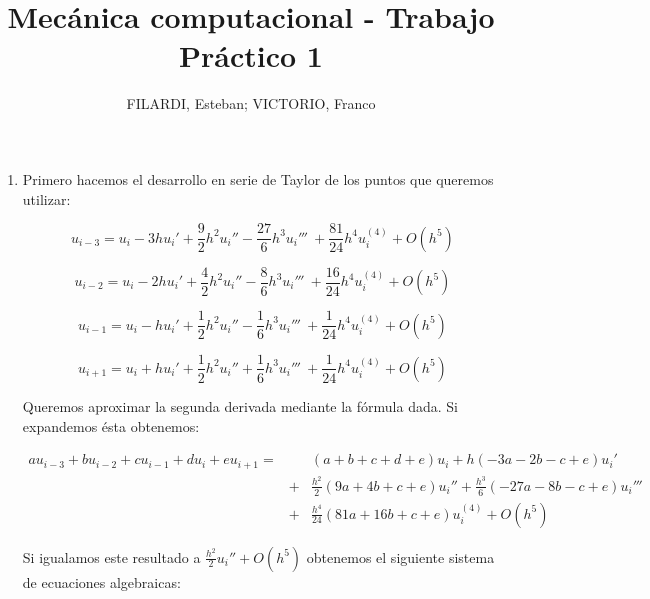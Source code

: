 \documentclass{article}
\title{\textbf{Mecánica computacional - Trabajo Práctico 1}}
\author{FILARDI, Esteban; VICTORIO, Franco}
\date{}
\begin{document}
\maketitle

\begin{enumerate}[1)]
    \item{ %
        Primero hacemos el desarrollo en serie de Taylor de los puntos que queremos utilizar:

        \[ u_{i-3} = u_i - 3 h u_i' + \frac{9}{2} h^2 u_i'' - \frac{27}{6} h^3 u_i''' \
                     + \frac{81}{24} h^4 u_i^{(4)} + O(h^5) \]

        \[ u_{i-2} = u_i - 2 h u_i' + \frac{4}{2} h^2 u_i'' - \frac{8}{6} h^3 u_i''' \
                     + \frac{16}{24} h^4 u_i^{(4)} + O(h^5) \]

        \[ u_{i-1} = u_i - h u_i' + \frac{1}{2} h^2 u_i'' - \frac{1}{6} h^3 u_i''' \
                     + \frac{1}{24} h^4 u_i^{(4)} + O(h^5) \]

        \[ u_{i+1} = u_i + h u_i' + \frac{1}{2} h^2 u_i'' + \frac{1}{6} h^3 u_i''' \
                     + \frac{1}{24} h^4 u_i^{(4)} + O(h^5) \]

        Queremos aproximar la segunda derivada mediante la fórmula dada. Si expandemos ésta obtenemos:

        \begin{eqnarray*}
            a u_{i-3} + b u_{i-2} + c u_{i-1} + d u_i + e u_{i+1} = &&(a+b+c+d+e) u_i + h (-3a -2b -c + e) u_i' \\
                                &+& \frac{h^2}{2} (9a + 4b + c + e) u_i'' + \frac{h^3}{6} (-27a -8b-c+e) u_i''' \\ 
                                &+& \frac{h^4}{24} (81a+16b+c+e) u_i^{(4)} + O(h^5)
        \end{eqnarray*}

        Si igualamos este resultado a $\frac{h^2}{2} u_i'' + O(h^5)$ obtenemos el siguiente sistema de ecuaciones
        algebraicas:

}
\end{enumerate}
\end{document}
